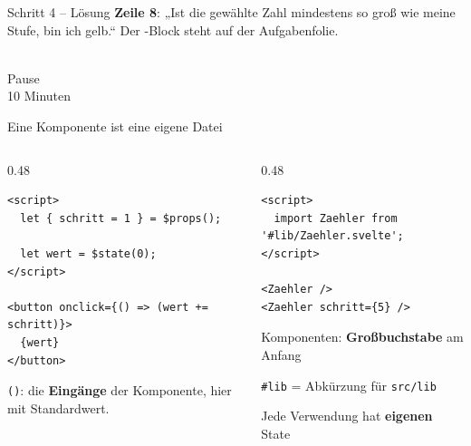 \begin{loesung}
\begin{frame}[fragile]{Schritt 4 -- Lösung}
  \vspace{0.3em}
  {\footnotesize \textbf{Zeile 8}: „Ist die gewählte Zahl mindestens so groß wie meine Stufe, bin ich gelb.“
  Der -Block steht auf der Aufgabenfolie.}
\end{frame}
\end{loesung}

\begin{frame}[plain,c]
  \centering
  {\Huge\textcolor{tug}{\faCoffee}}\\[1em]
  {\LARGE Pause}\\[0.5em]
  10 Minuten
\end{frame}


\begin{frame}[fragile]{Eine Komponente ist eine eigene Datei}
  \begin{columns}[onlytextwidth,t]
    \begin{column}{0.48\textwidth}
\begin{lstlisting}[style=svelte]
<script>
  let { schritt = 1 } = $props();

  let wert = $state(0);
</script>

<button onclick={() => (wert += schritt)}>
  {wert}
</button>
\end{lstlisting}
      \footnotesize {}\texttt{()}: die \textbf{Eingänge} der Komponente,
      hier mit Standardwert.
    \end{column}
    \begin{column}{0.48\textwidth}
\begin{lstlisting}[style=svelte]
<script>
  import Zaehler from '#lib/Zaehler.svelte';
</script>

<Zaehler />
<Zaehler schritt={5} />
\end{lstlisting}
      \footnotesize
      \begin{tugitemize}
        \item Komponenten: \textbf{Großbuchstabe} am Anfang
        \item \texttt{\#lib} = Abkürzung für \texttt{src/lib}
        \item Jede Verwendung hat \textbf{eigenen} State
      \end{tugitemize}
    \end{column}
  \end{columns}
\end{frame}

